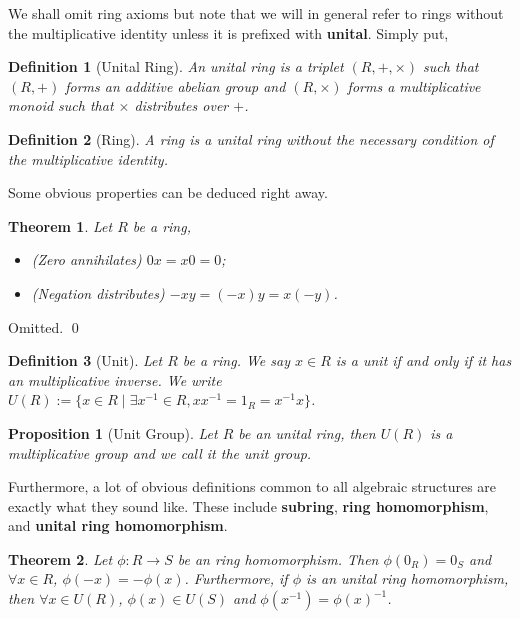 \documentclass[
]{article}
\newtheorem{theorem}{Theorem}
\newtheorem{definition}{Definition}[theorem]
\newtheorem{proposition}{Proposition}[theorem]
\begin{document}
We shall omit ring axioms but note that we will in general refer to
rings without the multiplicative identity unless it is prefixed with
\textbf{unital}. Simply put,

\begin{definition}[Unital Ring]
  An \textit{unital ring} is a triplet \((R, +, \times)\) such that \((R, +)\) 
  forms an additive abelian group and \((R, \times)\) forms a multiplicative 
  monoid such that \(\times\) distributes over \(+\).
\end{definition}
\begin{definition}[Ring]
  A \textit{ring} is a unital ring without the necessary condition of the 
  multiplicative identity. 
\end{definition}

Some obvious properties can be deduced right away.

\begin{theorem}
  Let \(R\) be a ring, 
  \begin{itemize}
    \item (Zero annihilates) \(0 x = x 0 = 0\);
    \item (Negation distributes) \(-xy = (-x)y = x(-y)\).
  \end{itemize}
\end{theorem}
\proof

Omitted. \qed

\begin{definition}[Unit]
  Let \(R\) be a ring. We say \(x \in R\) is a unit if and only if it has an 
  multiplicative inverse. We write 
  \(U(R) := \{x \in R \mid \exists x^{-1} \in R, x x^{-1} = 1_R = x^{-1} x\}\).
\end{definition}

\begin{proposition}[Unit Group]
  Let \(R\) be an unital ring, then \(U(R)\) is a multiplicative group and we 
  call it the \textit{unit group}.
\end{proposition}

Furthermore, a lot of obvious definitions common to all algebraic
structures are exactly what they sound like. These include
\textbf{subring}, \textbf{ring homomorphism}, and \textbf{unital ring
homomorphism}.

\begin{theorem}
  Let \(\phi : R \to S\) be an ring homomorphism. Then \(\phi(0_R) =0_S\) and 
  \(\forall x \in R\), \(\phi(-x) = -\phi(x)\). Furthermore, if \(\phi\) is an 
  unital ring homomorphism, then \(\forall x \in U(R)\),
  \(\phi(x) \in U(S)\) and \(\phi(x^{-1}) = \phi(x)^{-1}\).
\end{theorem}
\proof
\end{document}
